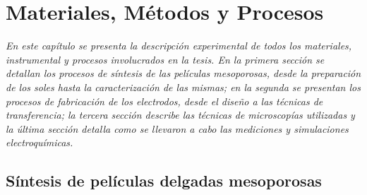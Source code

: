  \newcommand{\NoBiblioMat}[1]{
 \ifthenelse{\equal{#1}{verdadero}}{}{}
 \NoBiblioMat{verdadero}}


 \FormatoCapituloUnaLinea

 \chapter{Materiales, Métodos y Procesos}\label{chap:Materiales}

 \thispagestyle{empty}
	
  \noindent\textit{En este capítulo se presenta la descripción experimental de todos los materiales, instrumental y procesos involucrados en la tesis. En la primera sección se detallan los procesos de síntesis de las películas mesoporosas, desde la preparación de los soles hasta la caracterización de las mismas; en la segunda se presentan los procesos de fabricación de los electrodos, desde el diseño a las técnicas de transferencia; la tercera sección describe las técnicas de microscopías utilizadas y la última sección detalla como se llevaron a cabo las mediciones y simulaciones electroquímicas.}


 \vfill
 \minitoc
 \newpage


\section{Síntesis de películas delgadas mesoporosas}\label{sec:sintesis_mesoporosos}	
	
